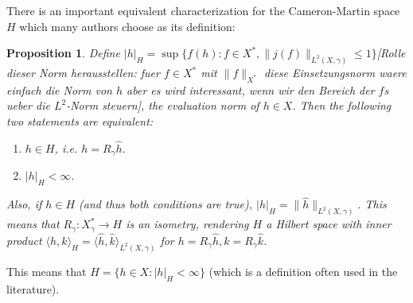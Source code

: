 \documentclass{scrartcl}
\newtheorem{prop}{Proposition}
\theoremstyle{definition}
\theoremstyle{remark}
\newcommand{\ednote}[1]{{\color{red}[#1]}}
\begin{document}
There is an important equivalent characterization for the Cameron-Martin space $H$ which many authors choose as its definition:
\begin{prop}
Define $|h|_H = \sup\{f(h): f\in X^*, \|j(f)\|_{L^2(X, \gamma)} \leq 1\}$\ednote{Rolle dieser Norm herausstellen: fuer $f\in X^*$ mit $\|f\|_{X^*}$ diese Einsetzungsnorm waere einfach die Norm von $h$ aber es wird interessant, wenn wir den Bereich der $f$s ueber die $L^2$-Norm steuern}, the evaluation norm of $h\in X$. Then the following two statements are equivalent:
\begin{enumerate}
\item $h\in H$, i.e. $h = R_\gamma \hat h$.
\item $|h|_H < \infty$.
\end{enumerate}
Also, if $h\in H$ (and thus both conditions are true), $|h|_H = \|\hat h\|_{L^2(X,\gamma)}$. This means that $R_\gamma: X_\gamma^* \to H$ is an isometry, rendering $H$ a Hilbert space  with inner product $\langle h, k\rangle_H = \langle \hat h, \hat k\rangle_{L^2(X,\gamma)}$ for $h = R_\gamma \hat h, k = R_\gamma \hat k$.
\end{prop}
This means that $H = \{h\in X: |h|_H < \infty\}$ (which is a definition often used in the literature).
\end{document}
